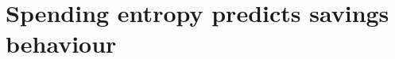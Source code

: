 
\chapter{Spending entropy predicts savings behaviour}%
\label{cha:entropy}





\begin{subappendices}

\end{subappendices}
